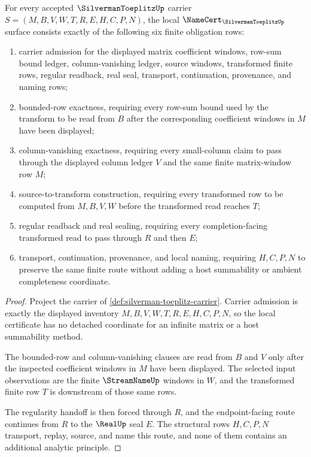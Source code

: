 \begin{theorem}\label{thm:silverman-toeplitz-namecert-obligations}
For every accepted $\SilvermanToeplitzUp$ carrier $S=(M,B,V,W,T,R,E,H,C,P,N)$, the local $\NameCert_{\SilvermanToeplitzUp}$ surface consists exactly of the following six finite obligation rows:
\begin{enumerate}
\item carrier admission for the displayed matrix coefficient windows, row-sum bound ledger, column-vanishing ledger, source windows, transformed finite rows, regular readback, real seal, transport, continuation, provenance, and naming rows;
\item bounded-row exactness, requiring every row-sum bound used by the transform to be read from $B$ after the corresponding coefficient windows in $M$ have been displayed;
\item column-vanishing exactness, requiring every small-column claim to pass through the displayed column ledger $V$ and the same finite matrix-window row $M$;
\item source-to-transform construction, requiring every transformed row to be computed from $M,B,V,W$ before the transformed read reaches $T$;
\item regular readback and real sealing, requiring every completion-facing transformed read to pass through $R$ and then $E$;
\item transport, continuation, provenance, and local naming, requiring $H,C,P,N$ to preserve the same finite route without adding a host summability or ambient completeness coordinate.
\end{enumerate}
\end{theorem}
\begin{proof}
Project the carrier of \autoref{def:silverman-toeplitz-carrier}. Carrier admission is exactly the displayed inventory $M,B,V,W,T,R,E,H,C,P,N$, so the local certificate has no detached coordinate for an infinite matrix or a host summability method.

The bounded-row and column-vanishing clauses are read from $B$ and $V$ only after the inspected coefficient windows in $M$ have been displayed. The selected input observations are the finite $\StreamNameUp$ windows in $W$, and the transformed finite row $T$ is downstream of those same rows.

The regularity handoff is then forced through $R$, and the endpoint-facing route continues from $R$ to the $\RealUp$ seal $E$. The structural rows $H,C,P,N$ transport, replay, source, and name this route, and none of them contains an additional analytic principle.
\end{proof}

